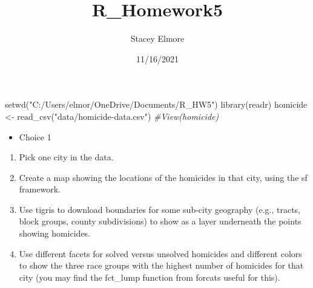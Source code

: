 \documentclass[
]{article}
\title{R\_Homework5}
\author{Stacey Elmore}
\date{11/16/2021}
\newenvironment{Shaded}{\begin{snugshade}}{\end{snugshade}}
\newcommand{\CommentTok}[1]{\textcolor[rgb]{0.56,0.35,0.01}{\textit{#1}}}
\newcommand{\FunctionTok}[1]{\textcolor[rgb]{0.00,0.00,0.00}{#1}}
\newcommand{\NormalTok}[1]{#1}
\newcommand{\OtherTok}[1]{\textcolor[rgb]{0.56,0.35,0.01}{#1}}
\newcommand{\StringTok}[1]{\textcolor[rgb]{0.31,0.60,0.02}{#1}}
\providecommand{\tightlist}{%
  \setlength{\itemsep}{0pt}\setlength{\parskip}{0pt}}
\begin{document}
\maketitle

\begin{Shaded}
\begin{Highlighting}[]
\FunctionTok{setwd}\NormalTok{(}\StringTok{"C:/Users/elmor/OneDrive/Documents/R\_HW5"}\NormalTok{)}
\FunctionTok{library}\NormalTok{(readr)}
\NormalTok{homicide }\OtherTok{\textless{}{-}} \FunctionTok{read\_csv}\NormalTok{(}\StringTok{"data/homicide{-}data.csv"}\NormalTok{)}
\CommentTok{\#View(homicide)}
\end{Highlighting}
\end{Shaded}

\begin{itemize}
\tightlist
\item
  Choice 1
\end{itemize}

\begin{enumerate}
\def\labelenumi{\arabic{enumi}.}
\item
  Pick one city in the data.
\item
  Create a map showing the locations of the homicides in that city,
  using the sf framework.
\item
  Use tigris to download boundaries for some sub-city geography (e.g.,
  tracts, block groups, county subdivisions) to show as a layer
  underneath the points showing homicides.
\item
  Use different facets for solved versus unsolved homicides and
  different colors to show the three race groups with the highest number
  of homicides for that city (you may find the fct\_lump function from
  forcats useful for this).
\end{enumerate}
\end{document}
